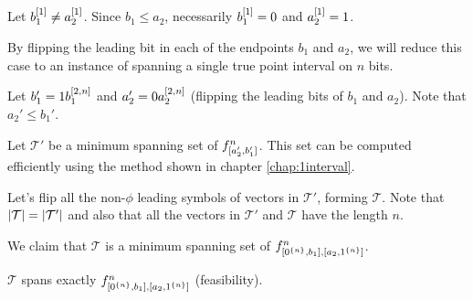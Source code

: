 Let $b_1^{[1]} \neq a_2^{[1]}$.
Since $b_1 \leq a_2$,
necessarily $b_1^{[1]} = 0$ and $a_2^{[1]} = 1$.

By flipping the leading bit in each of the endpoints
$b_1$ and $a_2$,
we will reduce this case
to an instance of spanning a single true point interval
on $n$ bits.


Let $b_1' = 1 b_1^{[2, n]}$
and $a_2' = 0 a_2^{[2, n]}$
(flipping the leading bits of $b_1$ and $a_2$).
Note that $a_2' \leq b_1'$.

Let $\mathcal{T}'$ be a minimum spanning set
of $f^{n}_{[a_2', b_1']}$.
This set can be computed efficiently
using the method shown
in chapter \ref{chap:1interval}.

Let's flip all the non-$\phi$ leading symbols
of vectors in $\mathcal{T}'$,
forming $\mathcal{T}$.
Note that $\lvert\mathcal{T}\rvert = \lvert\mathcal{T}'\rvert$
and also that all the vectors in $\mathcal{T}'$
and $\mathcal{T}$ have the length $n$.

We claim that $\mathcal{T}$ is a minimum spanning set
of $f^{n}_{[0^{\{n\}}, b_1], [a_2, 1^{\{n\}}]}$.

\begin{theorem} \label{diffsound}
$\mathcal{T}$ spans exactly $f^{n}_{[0^{\{n\}}, b_1], [a_2, 1^{\{n\}}]}$ (feasibility).
\end{theorem}


